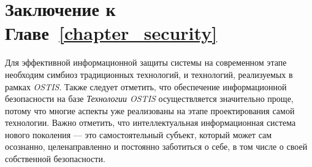 \section*{Заключение к Главе~\ref{chapter_security}}
Для эффективной информационной защиты системы на современном этапе необходим симбиоз традиционных технологий, и технологий, реализуемых в рамках \textit{OSTIS}. Также следует отметить, что обеспечение информационной безопасности на базе \textit{Технологии OSTIS} осуществляется значительно проще, потому что многие аспекты уже реализованы на этапе проектирования самой технологии. Важно отметить, что интеллектуальная информационная система нового поколения --- это самостоятельный субъект, который может сам осознанно, целенаправленно и постоянно заботиться о себе, в том числе о своей собственной безопасности.


%